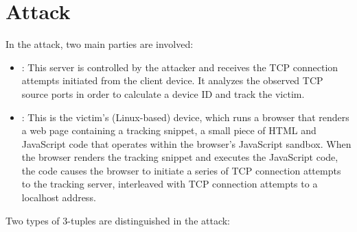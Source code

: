 \documentclass{report}
\begin{document}
\begin{center}
	\begin{minipage}[t]{0.5\textwidth}
		\vspace{0cm}

		
	\end{minipage}
\end{center}


\vspace{0.5cm}
\chapter{Attack}
\label{sec:attack}

In the attack, two main parties are involved:

\begin{itemize}
    \item {}: This server is controlled by the \alert{attacker} and receives the TCP connection attempts initiated from the client device. It analyzes the observed TCP source ports in order to calculate a device ID and track the victim.%
    
    \item {}: This is the \alert{victim’s} (Linux-based) device, which runs a browser that renders a web page containing a \alert{tracking snippet}, a small piece of HTML and JavaScript code that operates within the browser’s JavaScript sandbox. When the browser renders the tracking snippet and executes the JavaScript code, the code causes the browser to initiate a series of TCP connection attempts to the \alert{tracking server}, interleaved with TCP connection attempts to a \alert{localhost address}. %
\end{itemize}

Two types of 3-tuples are distinguished in the attack:
\end{document}
